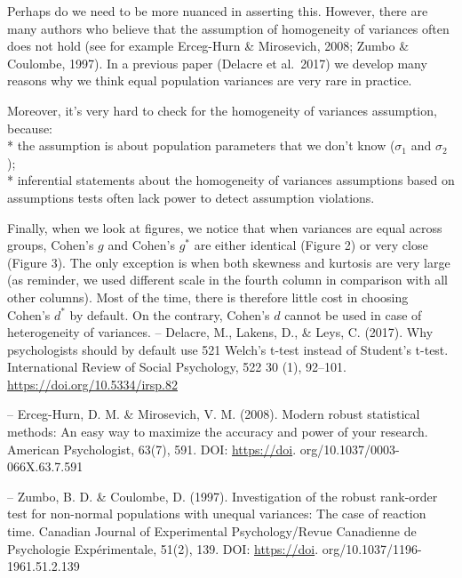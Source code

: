 \documentclass[
  12pt,
  french,
]{article}
\begin{document}
\color{blue} Perhaps do we need to be more nuanced in asserting this.
However, there are many authors who believe that the assumption of
homogeneity of variances often does not hold (see for example Erceg-Hurn
\& Mirosevich, 2008; Zumbo \& Coulombe, 1997). In a previous paper
(Delacre et al.~2017) we develop many reasons why we think equal
population variances are very rare in practice.

Moreover, it's very hard to check for the homogeneity of variances
assumption, because:\\
* the assumption is about population parameters that we don't know
(\(\sigma_1\) and \(\sigma_2\));\\
* inferential statements about the homogeneity of variances assumptions
based on assumptions tests often lack power to detect assumption
violations.

Finally, when we look at figures, we notice that when variances are
equal across groups, Cohen's \(g\) and Cohen's \(g^*\) are either
identical (Figure 2) or very close (Figure 3). The only exception is
when both skewness and kurtosis are very large (as reminder, we used
different scale in the fourth column in comparison with all other
columns). Most of the time, there is therefore little cost in choosing
Cohen's \(d^*\) by default. On the contrary, Cohen's \(d\) cannot be
used in case of heterogeneity of variances. -- Delacre, M., Lakens, D.,
\& Leys, C. (2017). Why psychologists should by default use 521 Welch's
t-test instead of Student's t-test. International Review of Social
Psychology, 522 30 (1), 92--101. \url{https://doi.org/10.5334/irsp.82}

-- Erceg-Hurn, D. M. \& Mirosevich, V. M. (2008). Modern robust
statistical methods: An easy way to maximize the accuracy and power of
your research. American Psychologist, 63(7), 591. DOI:
\url{https://doi}. org/10.1037/0003-066X.63.7.591

-- Zumbo, B. D. \& Coulombe, D. (1997). Investigation of the robust
rank-order test for non-normal populations with unequal variances: The
case of reaction time. Canadian Journal of Experimental Psychology/Revue
Canadienne de Psychologie Expérimentale, 51(2), 139. DOI:
\url{https://doi}. org/10.1037/1196-1961.51.2.139

\color{black}
\end{document}
